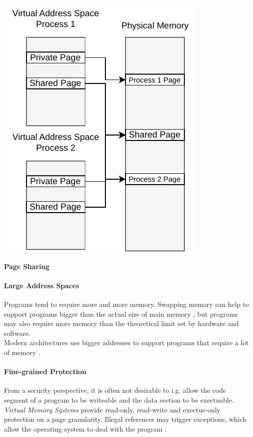 \begin{marginfigure}
    \includegraphics*[width=1\marginparwidth]{figures/fund_share.pdf}
    \caption{\textbf{Page Sharing}}
\end{marginfigure}


\paragraph{Large Address Spaces} Programs tend to require more and more memory. Swapping memory can help
to support programs bigger than the actual size of main memory \cite{tanenbaumOS}, but programs may
also require more memory than the theoretical limit set by hardware and software.\\ Modern architectures
use bigger addresses to support programs that require a lot of memory
\cite{jacobSoftwaremanagedAddressTranslation1997, jacobVirtualMemoryContemporary1998}.


\paragraph{Fine-grained Protection} From a security perspective, it is often not desirable to i.g. allow the code segment
of a program to be writeable and the data section to be exectuable.\\\textit{Virtual Memory Systems} provide read-only,
read-write and exectue-only protection on a page granularity\cite{jacobSoftwaremanagedAddressTranslation1997}.
Illegal references may trigger exceptions, which allow the operating system to deal with the program \cite{jacobVirtualMemoryContemporary1998}.

